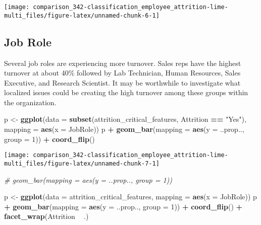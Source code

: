 \documentclass[]{book}
\newenvironment{Shaded}{\begin{snugshade}}{\end{snugshade}}
\newcommand{\CommentTok}[1]{\textcolor[rgb]{0.56,0.35,0.01}{\textit{#1}}}
\newcommand{\DataTypeTok}[1]{\textcolor[rgb]{0.13,0.29,0.53}{#1}}
\newcommand{\DecValTok}[1]{\textcolor[rgb]{0.00,0.00,0.81}{#1}}
\newcommand{\KeywordTok}[1]{\textcolor[rgb]{0.13,0.29,0.53}{\textbf{#1}}}
\newcommand{\NormalTok}[1]{#1}
\newcommand{\OperatorTok}[1]{\textcolor[rgb]{0.81,0.36,0.00}{\textbf{#1}}}
\newcommand{\StringTok}[1]{\textcolor[rgb]{0.31,0.60,0.02}{#1}}
\begin{document}
\begin{center}\texttt{[image: comparison\_342-classification\_employee\_attrition-lime-multi\_files/figure-latex/unnamed-chunk-6-1]} \end{center}

\hypertarget{job-role}{%
\subsection{Job Role}\label{job-role}}

Several job roles are experiencing more turnover. Sales reps have the highest turnover at about 40\% followed by Lab Technician, Human Resources, Sales Executive, and Research Scientist. It may be worthwhile to investigate what localized issues could be creating the high turnover among these groups within the organization.

\begin{Shaded}
\begin{Highlighting}[]
\NormalTok{p <-}\StringTok{ }\KeywordTok{ggplot}\NormalTok{(}\DataTypeTok{data =} \KeywordTok{subset}\NormalTok{(attrition_critical_features, Attrition }\OperatorTok{==}\StringTok{ "Yes"}\NormalTok{),}
            \DataTypeTok{mapping =} \KeywordTok{aes}\NormalTok{(}\DataTypeTok{x =}\NormalTok{ JobRole))}
\NormalTok{p }\OperatorTok{+}\StringTok{ }\KeywordTok{geom_bar}\NormalTok{(}\DataTypeTok{mapping =} \KeywordTok{aes}\NormalTok{(}\DataTypeTok{y =}\NormalTok{ ..prop.., }\DataTypeTok{group =} \DecValTok{1}\NormalTok{)) }\OperatorTok{+}\StringTok{ }
\StringTok{    }\KeywordTok{coord_flip}\NormalTok{()}
\end{Highlighting}
\end{Shaded}

\begin{center}\texttt{[image: comparison\_342-classification\_employee\_attrition-lime-multi\_files/figure-latex/unnamed-chunk-7-1]} \end{center}

\begin{Shaded}
\begin{Highlighting}[]

\CommentTok{# geom_bar(mapping = aes(y = ..prop.., group = 1)) }
\end{Highlighting}
\end{Shaded}

\begin{Shaded}
\begin{Highlighting}[]
\NormalTok{p <-}\StringTok{ }\KeywordTok{ggplot}\NormalTok{(}\DataTypeTok{data =}\NormalTok{ attrition_critical_features,}
            \DataTypeTok{mapping =} \KeywordTok{aes}\NormalTok{(}\DataTypeTok{x =}\NormalTok{ JobRole))}
\NormalTok{p }\OperatorTok{+}\StringTok{ }\KeywordTok{geom_bar}\NormalTok{(}\DataTypeTok{mapping =} \KeywordTok{aes}\NormalTok{(}\DataTypeTok{y =}\NormalTok{ ..prop.., }\DataTypeTok{group =} \DecValTok{1}\NormalTok{)) }\OperatorTok{+}\StringTok{ }
\StringTok{    }\KeywordTok{coord_flip}\NormalTok{() }\OperatorTok{+}
\StringTok{    }\KeywordTok{facet_wrap}\NormalTok{(Attrition }\OperatorTok{~}\StringTok{ }\NormalTok{.)}
\end{Highlighting}
\end{Shaded}
\end{document}
